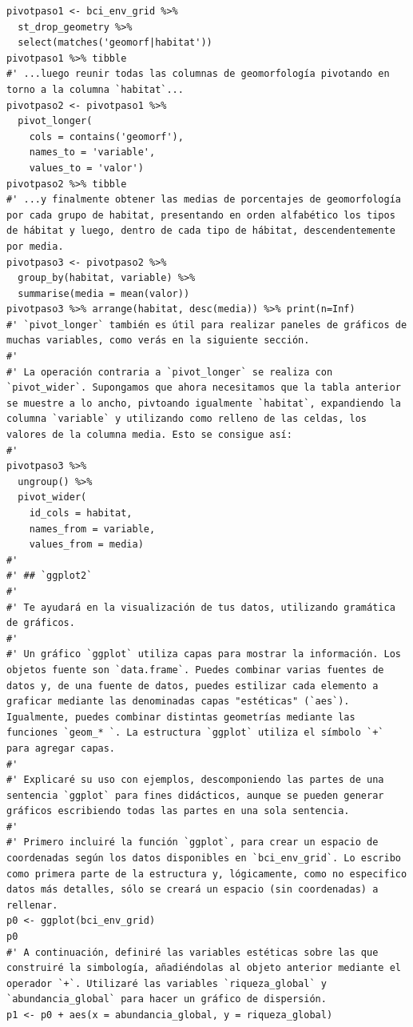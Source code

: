 \documentclass[11pt,]{article}
\begin{document}
\begin{verbatim}
pivotpaso1 <- bci_env_grid %>%
  st_drop_geometry %>% 
  select(matches('geomorf|habitat'))
pivotpaso1 %>% tibble
#' ...luego reunir todas las columnas de geomorfología pivotando en torno a la columna `habitat`...
pivotpaso2 <- pivotpaso1 %>%
  pivot_longer(
    cols = contains('geomorf'),
    names_to = 'variable',
    values_to = 'valor')
pivotpaso2 %>% tibble
#' ...y finalmente obtener las medias de porcentajes de geomorfología por cada grupo de habitat, presentando en orden alfabético los tipos de hábitat y luego, dentro de cada tipo de hábitat, descendentemente por media.
pivotpaso3 <- pivotpaso2 %>%
  group_by(habitat, variable) %>% 
  summarise(media = mean(valor))
pivotpaso3 %>% arrange(habitat, desc(media)) %>% print(n=Inf)
#' `pivot_longer` también es útil para realizar paneles de gráficos de muchas variables, como verás en la siguiente sección.
#' 
#' La operación contraria a `pivot_longer` se realiza con `pivot_wider`. Supongamos que ahora necesitamos que la tabla anterior se muestre a lo ancho, pivtoando igualmente `habitat`, expandiendo la columna `variable` y utilizando como relleno de las celdas, los valores de la columna media. Esto se consigue así:
#' 
pivotpaso3 %>%
  ungroup() %>%
  pivot_wider(
    id_cols = habitat,
    names_from = variable,
    values_from = media)
#' 
#' ## `ggplot2`
#' 
#' Te ayudará en la visualización de tus datos, utilizando gramática de gráficos.
#'
#' Un gráfico `ggplot` utiliza capas para mostrar la información. Los objetos fuente son `data.frame`. Puedes combinar varias fuentes de datos y, de una fuente de datos, puedes estilizar cada elemento a graficar mediante las denominadas capas "estéticas" (`aes`). Igualmente, puedes combinar distintas geometrías mediante las funciones `geom_* `. La estructura `ggplot` utiliza el símbolo `+` para agregar capas.
#' 
#' Explicaré su uso con ejemplos, descomponiendo las partes de una sentencia `ggplot` para fines didácticos, aunque se pueden generar gráficos escribiendo todas las partes en una sola sentencia.
#' 
#' Primero incluiré la función `ggplot`, para crear un espacio de coordenadas según los datos disponibles en `bci_env_grid`. Lo escribo como primera parte de la estructura y, lógicamente, como no especifico datos más detalles, sólo se creará un espacio (sin coordenadas) a rellenar.
p0 <- ggplot(bci_env_grid)
p0
#' A continuación, definiré las variables estéticas sobre las que construiré la simbología, añadiéndolas al objeto anterior mediante el operador `+`. Utilizaré las variables `riqueza_global` y `abundancia_global` para hacer un gráfico de dispersión.
p1 <- p0 + aes(x = abundancia_global, y = riqueza_global)

\end{verbatim}
\end{document}
